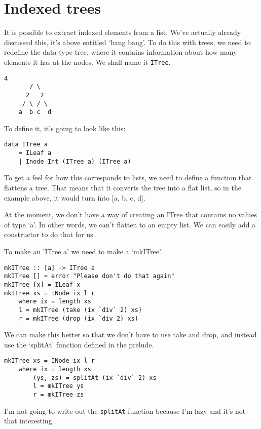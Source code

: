 \documentclass[11pt,a4paper,titlepage,dvipsnames,cmyk]{scrartcl}
\begin{document}
\section{Indexed trees}%
\label{sec:index}

It is possible to extract indexed elements from a list. We've actually
already discussed this, it's above entitled `bang bang'. To do this with
trees, we need to redefine the data type tree, where it contains
information about how many elements it has at the nodes. We shall name it
\lstinline|ITree|.

\begin{lstlisting}[style=B]
        4
       / \
      2   2
     / \ / \
    a  b c  d
\end{lstlisting}

To define it, it's going to look like this:
\begin{lstlisting}[style=B]
data ITree a
    = ILeaf a
    | Inode Int (ITree a) (ITree a)
\end{lstlisting}
To get a feel for how this corresponds to lists, we need to define a
function that flattens a tree. That means that it converts the tree into a
flat list, so in the example above, it would turn into [a, b, c, d].

At the moment, we don't have a way of creating an ITree that contains no
values of type `a'. In other words, we can't flatten to an empty list. We
can easily add a constructor to do that for us. 

To make an 'ITree a' we need to make a `mkITree'.

\begin{lstlisting}[style=B]
mkITree :: [a] -> ITree a
mkITree [] = error "Please don't do that again"
mkITree [x] = ILeaf x
mkITree xs = INode ix l r
    where ix = length xs
    l = mkITree (take (ix `div` 2) xs)
    r = mkITree (drop (ix `div 2) xs)
\end{lstlisting}

We can make this better so that we don't have to use take and drop, and
instead use the `splitAt' function defined in the prelude.

\begin{lstlisting}[style=B]
mkITree xs = INode ix l r
    where ix = length xs
        (ys, zs) = splitAt (ix `div` 2) xs
        l = mkITree ys
        r = mkITree zs
\end{lstlisting}

I'm not going to write out the \lstinline|splitAt| function because I'm
lazy and it's not that interesting.
\end{document}
